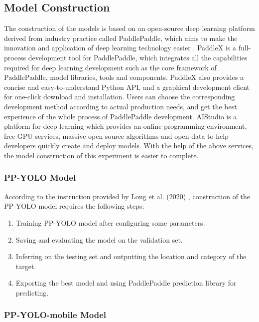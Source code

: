 \documentclass[sensors,article,submit,moreauthors,pdftex]{Definitions/mdpi}
\begin{document}
\begin{paracol}{2}
\subsection{Model Construction}

The construction of the models is based on an open-source deep learning platform derived from industry practice called PaddlePaddle, which aims to make the innovation and application of deep learning technology easier \cite{ma2019paddlepaddle}.
PaddleX is a full-process development tool for PaddlePaddle, which integrates all the capabilities required for deep learning development such as the core framework of PaddlePaddle, model libraries, tools and components. PaddleX also provides a concise and easy-to-understand Python API, and a graphical development client for one-click download and installation. Users can choose the corresponding development method according to actual production needs, and get the best experience of the whole process of PaddlePaddle development. AIStudio is a platform for deep learning which provides an online programming environment, free GPU services, massive open-source algorithms and open data to help developers quickly create and deploy models. 
With the help of the above services, the model construction of this experiment is easier to complete.

\subsubsection{PP-YOLO Model}

According to the instruction provided by Long et al. (2020) \cite{long2020pp}, construction of the PP-YOLO model requires the following steps:

\begin{enumerate}
\item Training PP-YOLO model after configuring some parameters.
\item Saving and evaluating the model on the validation set.
\item Inferring on the testing set and outputting the location and category of the target.
\item Exporting the best model and using PaddlePaddle prediction library for predicting.
\end{enumerate}

\subsubsection{PP-YOLO-mobile Model}


\end{paracol}
\end{document}
